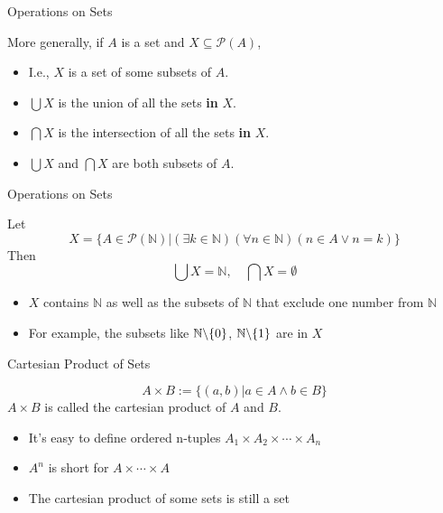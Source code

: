 \begin{frame}{Operations on Sets}
    \begin{definition}
        More generally, if $A$ is a set and $X\subseteq \mathscr{P}(A)$,
    \end{definition}
    \begin{itemize}
        \item I.e., $X$ is a set of some subsets of $A$. 
        \item $\bigcup X$ is the union of all the sets \textbf{in} $X$.
        \item $\bigcap X$ is the intersection of all the sets \textbf{in} $X$.
        \item $\bigcup X$ and $\bigcap X$ are both subsets of $A$.
    \end{itemize}
\end{frame}

\begin{frame}{Operations on Sets}
    \begin{example}
        Let $$X = \{A \in \mathscr{P}(\mathbb{N}) | (\exists k\in \mathbb{N})(\forall n \in \mathbb{N})(n \in A \vee n = k)\}$$
        Then $$\bigcup X=\mathbb{N},\quad \bigcap X=\emptyset$$
    \end{example}
    \begin{itemize}
        \item $X$ contains $\mathbb{N}$ as well as the subsets of $\mathbb{N}$ that exclude one number from $\mathbb{N}$
        \item For example, the subsets like $\mathbb{N}\backslash \{0\}$, $\mathbb{N}\backslash \{1\}$ are in $X$
    \end{itemize}
\end{frame}

\begin{frame}{Cartesian Product of Sets}
    \begin{definition}
        $$A\times B:=\{(a,b)|a\in A\wedge b\in B\}$$
        $A\times B$ is called the cartesian product of $A$ and $B$.
    \end{definition}
    \begin{itemize}
        \item It's easy to define ordered n-tuples $A_1\times A_2\times\cdots\times A_n$
        \item $A^n$ is short for $A\times\cdots\times A$
        \item The cartesian product of some sets is still a set
    \end{itemize}
\end{frame}

